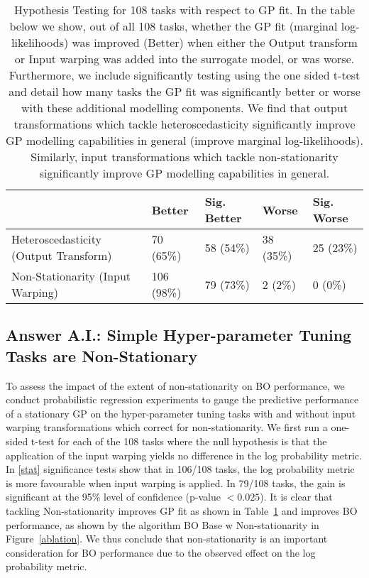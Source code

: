 \documentclass[jair,twoside,11pt,theapa]{article}
\theoremstyle{definition}
\begin{document}
\begin{table}[ht!]
\caption{Hypothesis Testing for 108 tasks with respect to GP fit. In the table below we show, out of all 108 tasks, whether the GP fit (marginal log-likelihoods) was improved (Better) when either the Output transform or Input warping was added into the surrogate model, or was worse. Furthermore, we include significantly testing using the one sided t-test and detail how many tasks the GP fit was significantly better or worse with these additional modelling components. We find that output transformations which tackle heteroscedasticity significantly improve GP modelling capabilities in general (improve marginal log-likelihoods). Similarly, input transformations which tackle non-stationarity significantly improve GP modelling capabilities in general.}
\centering
\begin{tabular}{lllll}
\hline
 & Better & Sig. Better & Worse & Sig. Worse \\ \hline
Heteroscedasticity (Output Transform) & 70 (65\%)  & 58 (54\%) & 38 (35\%) & 25 (23\%)\\
Non-Stationarity (Input Warping) & 106 (98\%) & 79 (73\%) & 2 (2\%) & 0 (0\%)
\end{tabular}
\label{stat}
\end{table}


\subsection{Answer A.I.: Simple Hyper-parameter Tuning Tasks are Non-Stationary} \label{Sec:nonStat}
To assess the impact of the extent of non-stationarity on BO performance, we conduct probabilistic regression experiments to gauge the predictive performance of a stationary GP on the hyper-parameter tuning tasks with and without input warping transformations which correct for non-stationarity. We first run a one-sided t-test for each of the 108 tasks where the null hypothesis is that the application of the input warping yields no difference in the log probability metric. In \autoref{stat} significance tests show that in 106/108 tasks, the log probability metric is more favourable when input warping is applied. In 79/108 tasks, the gain is significant at the 95\% level of confidence (p-value $< 0.025$). It is clear that tackling Non-stationarity improves GP fit as shown in Table~\ref{stat} and improves BO performance, as shown by the algorithm BO Base w Non-stationarity in Figure~\ref{ablation}. We thus conclude that non-stationarity is an important consideration for BO performance due to the observed effect on the log probability metric.
\end{document}
